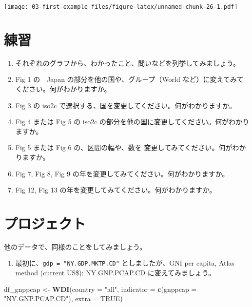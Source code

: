 \documentclass[
  xelatex, ja=standard]{bxjsbook}
\newenvironment{Shaded}{\begin{snugshade}}{\end{snugshade}}
\newcommand{\AttributeTok}[1]{\textcolor[rgb]{0.13,0.29,0.53}{#1}}
\newcommand{\ConstantTok}[1]{\textcolor[rgb]{0.56,0.35,0.01}{#1}}
\newcommand{\FunctionTok}[1]{\textcolor[rgb]{0.13,0.29,0.53}{\textbf{#1}}}
\newcommand{\NormalTok}[1]{#1}
\newcommand{\OtherTok}[1]{\textcolor[rgb]{0.56,0.35,0.01}{#1}}
\newcommand{\StringTok}[1]{\textcolor[rgb]{0.31,0.60,0.02}{#1}}
\providecommand{\tightlist}{%
  \setlength{\itemsep}{0pt}\setlength{\parskip}{0pt}}
\theoremstyle{definition}
\theoremstyle{definition}
\theoremstyle{definition}
\theoremstyle{definition}
\theoremstyle{remark}
\begin{document}
\texttt{[image: 03-first-example\_files/figure-latex/unnamed-chunk-26-1.pdf]}

\hypertarget{ux7df4ux7fd2}{%
\section{練習}\label{ux7df4ux7fd2}}

\begin{enumerate}
\def\labelenumi{\arabic{enumi}.}
\tightlist
\item
  それぞれのグラフから、わかったこと、問いなどを列挙してみましょう。
\item
  Fig 1 の　Japan の部分を他の国や、グループ（World など）に変えてみてください。何がわかりますか。
\item
  Fig 3 の iso2c で選択する、国を変更してください。何がわかりますか。
\item
  Fig 4 または Fig 5 の iso2c の部分を他の国に変更してください。何がわかりますか。
\item
  Fig 5 または Fig 6 の、区間の幅や、数を 変更してみてください。何がわかりますか。
\item
  Fig 7, Fig 8, Fig 9 の年を変更してみてください。何がわかりますか。
\item
  Fig 12, Fig 13 の年を変更してみてください。何がわかりますか。
\end{enumerate}

\hypertarget{ux30d7ux30edux30b8ux30a7ux30afux30c8}{%
\section{プロジェクト}\label{ux30d7ux30edux30b8ux30a7ux30afux30c8}}

他のデータで、同様のことをしてみましょう。

\begin{enumerate}
\def\labelenumi{\arabic{enumi}.}
\tightlist
\item
  最初に、\texttt{gdp\ =\ "NY.GDP.MKTP.CD"} としましたが、GNI per capita, Atlas method (current US\$): NY.GNP.PCAP.CD に変えてみましょう。
\end{enumerate}

\begin{Shaded}
\begin{Highlighting}[]
\NormalTok{df\_gnppcap }\OtherTok{\textless{}{-}} \FunctionTok{WDI}\NormalTok{(}\AttributeTok{country =} \StringTok{"all"}\NormalTok{, }
              \AttributeTok{indicator =} \FunctionTok{c}\NormalTok{(}\AttributeTok{gnppcap =} \StringTok{"NY.GNP.PCAP.CD"}\NormalTok{), }
              \AttributeTok{extra =} \ConstantTok{TRUE}\NormalTok{)}
\end{Highlighting}
\end{Shaded}
\end{document}
